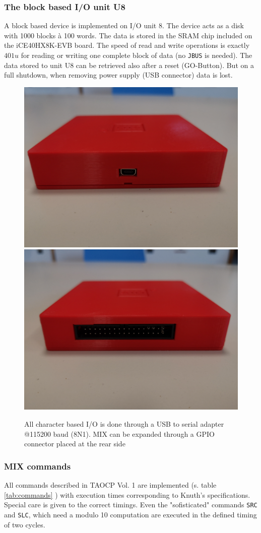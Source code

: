 \documentclass[a4paper,ngerman]{scrartcl}
\begin{document}
\subsubsection{The block based I/O unit U8}

A block based device is implemented on I/O unit 8. The device acts as a disk with 1000 blocks à 100 words. The data is stored in the SRAM chip included on the iCE40HX8K-EVB board. The speed of read and write operations is exactly $401 u$ for reading or writing one complete block of data (no \lstinline|JBUS| is needed). The data stored to unit U8 can be retrieved also after a reset (GO-Button). But on a full shutdown, when removing power supply (USB connector) data is lost.

\begin{figure}
	\centering
	\includegraphics[width=0.45\linewidth]{MIX_usb.jpg}
	\includegraphics[width=0.45\linewidth]{MIX_gpio.jpg}
	
	\caption{All character based I/O is done through a USB to serial adapter @115200 baud (8N1). MIX can be expanded through a GPIO connector placed at the rear side }
	\label{fig:mixusb}
\end{figure}



\subsubsection{MIX commands}
All commands described in TAOCP Vol. 1 are implemented (s. table \ref{tab:commands} ) with execution times corresponding to Knuth's specifications. Special care is given to the correct timings. Even the "sofisticated" commands \lstinline|SRC| and \lstinline|SLC|, which need a modulo 10 computation are executed in the defined timing of two cycles.
\end{document}
